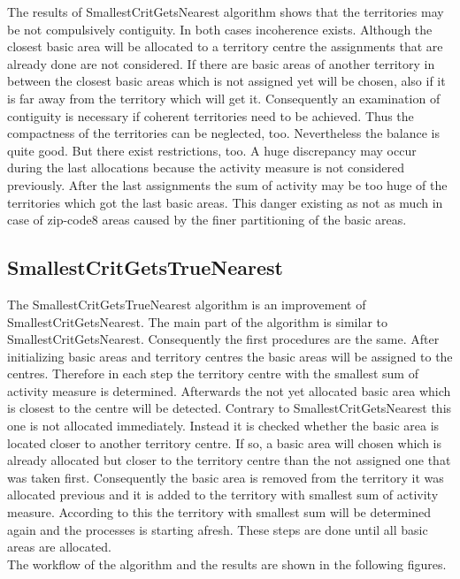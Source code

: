 The results of SmallestCritGetsNearest algorithm shows that the territories may be not compulsively contiguity. In both cases incoherence exists. Although the closest basic area will be allocated to a territory centre the assignments that are already done are not considered. If there are basic areas of another territory in between the closest basic areas which is not assigned yet will be chosen, also if it is far away from the territory which will get it. Consequently an examination of contiguity is necessary if coherent territories need to be achieved. Thus the compactness of the territories can be neglected, too. Nevertheless the balance is quite good. But there exist restrictions, too. A huge discrepancy may occur during the last allocations because the activity measure is not considered previously. After the last assignments the sum of activity may be too huge of the territories which got the last basic areas. This danger existing as not as much in case of zip-code8 areas caused by the finer partitioning of the basic areas.

\subsection{SmallestCritGetsTrueNearest}

The SmallestCritGetsTrueNearest algorithm is an improvement of SmallestCritGetsNearest. The main part of the algorithm is similar to SmallestCritGetsNearest. Consequently the first procedures are the same. After initializing basic areas and territory centres the basic areas will be assigned to the centres. Therefore in each step the territory centre with the smallest sum of activity measure is determined. Afterwards the not yet allocated basic area which is closest to the centre will be detected. Contrary to SmallestCritGetsNearest this one is not allocated immediately. Instead it is checked whether the basic area is located closer to another territory centre. If so, a basic area will chosen which is already allocated but closer to the territory centre than the not assigned one that was taken first. Consequently the basic area is removed from the territory it was allocated previous and it is added to the territory with smallest sum of activity measure. According to this the territory with smallest sum will be determined again and the processes is starting afresh. These steps are done until all basic areas are allocated.\\
The workflow of the algorithm and the results are shown in the following figures.

